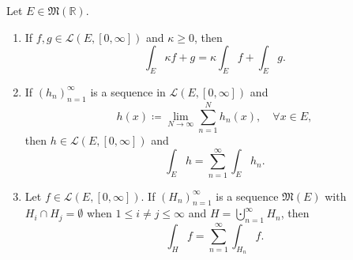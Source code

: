 \documentclass[notoc,notitlepage]{tufte-book}
\begin{document}
\begin{crly}\label{crly:linearity_of_the_lebesgue_integral_and_other_results}
  Let $E \in \mathfrak{M}(\mathbb{R})$.
  \begin{enumerate}
    \item If $f, g \in \mathcal{L}(E, [0, \infty])$ and $\kappa \geq 0$, then
      \begin{equation*}
        \int_{E} \kappa f + g = \kappa \int_{E} f + \int_{E} g. 
      \end{equation*}
    \item If $(h_n)_{n=1}^{\infty}$ is a sequence in $\mathcal{L}(E, [0,
      \infty])$ and
      \begin{equation*}
        h(x) \coloneqq \lim_{N \to \infty} \sum_{n=1}^{N} h_n(x), \quad \forall
        x \in E,
      \end{equation*}
      then $h \in \mathcal{L}(E, [0, \infty])$ and
      \begin{equation*}
        \int_{E} h = \sum_{n=1}^{\infty} \int_{E} h_n.
      \end{equation*}
    \item Let $f \in \mathcal{L}(E, [0, \infty])$. If $(H_n)_{n=1}^{\infty}$ is
      a sequence $\mathfrak{M}(E)$ with $H_i \cap H_j = \emptyset$ when $1 \leq
      i \neq j \leq \infty$ and $H = \bigcupdot_{n=1}^{\infty} H_n$, then
      \begin{equation*}
        \int_{H} f = \sum_{n=1}^{\infty} \int_{H_n} f.
      \end{equation*}
  \end{enumerate}
\end{crly}
\end{document}
